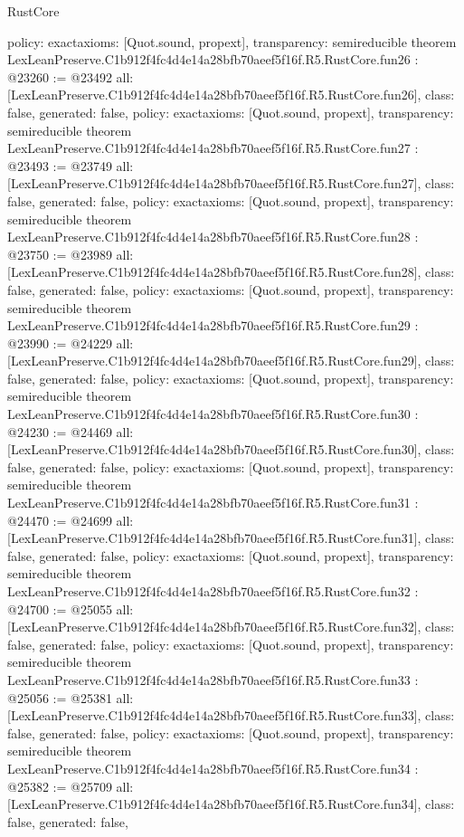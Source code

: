 \begin{lexlean}{RustCore}
\begin{coremodule}
{  policy: exact{axioms: [Quot.sound, propext]},
  transparency: semireducible
}
theorem LexLeanPreserve.C1b912f4fc4d4e14a28bfb70aeef5f16f.R5.RustCore.fun26 : @23260 := @23492 {
  all: [LexLeanPreserve.C1b912f4fc4d4e14a28bfb70aeef5f16f.R5.RustCore.fun26],
  class: false,
  generated: false,
  policy: exact{axioms: [Quot.sound, propext]},
  transparency: semireducible
}
theorem LexLeanPreserve.C1b912f4fc4d4e14a28bfb70aeef5f16f.R5.RustCore.fun27 : @23493 := @23749 {
  all: [LexLeanPreserve.C1b912f4fc4d4e14a28bfb70aeef5f16f.R5.RustCore.fun27],
  class: false,
  generated: false,
  policy: exact{axioms: [Quot.sound, propext]},
  transparency: semireducible
}
theorem LexLeanPreserve.C1b912f4fc4d4e14a28bfb70aeef5f16f.R5.RustCore.fun28 : @23750 := @23989 {
  all: [LexLeanPreserve.C1b912f4fc4d4e14a28bfb70aeef5f16f.R5.RustCore.fun28],
  class: false,
  generated: false,
  policy: exact{axioms: [Quot.sound, propext]},
  transparency: semireducible
}
theorem LexLeanPreserve.C1b912f4fc4d4e14a28bfb70aeef5f16f.R5.RustCore.fun29 : @23990 := @24229 {
  all: [LexLeanPreserve.C1b912f4fc4d4e14a28bfb70aeef5f16f.R5.RustCore.fun29],
  class: false,
  generated: false,
  policy: exact{axioms: [Quot.sound, propext]},
  transparency: semireducible
}
theorem LexLeanPreserve.C1b912f4fc4d4e14a28bfb70aeef5f16f.R5.RustCore.fun30 : @24230 := @24469 {
  all: [LexLeanPreserve.C1b912f4fc4d4e14a28bfb70aeef5f16f.R5.RustCore.fun30],
  class: false,
  generated: false,
  policy: exact{axioms: [Quot.sound, propext]},
  transparency: semireducible
}
theorem LexLeanPreserve.C1b912f4fc4d4e14a28bfb70aeef5f16f.R5.RustCore.fun31 : @24470 := @24699 {
  all: [LexLeanPreserve.C1b912f4fc4d4e14a28bfb70aeef5f16f.R5.RustCore.fun31],
  class: false,
  generated: false,
  policy: exact{axioms: [Quot.sound, propext]},
  transparency: semireducible
}
theorem LexLeanPreserve.C1b912f4fc4d4e14a28bfb70aeef5f16f.R5.RustCore.fun32 : @24700 := @25055 {
  all: [LexLeanPreserve.C1b912f4fc4d4e14a28bfb70aeef5f16f.R5.RustCore.fun32],
  class: false,
  generated: false,
  policy: exact{axioms: [Quot.sound, propext]},
  transparency: semireducible
}
theorem LexLeanPreserve.C1b912f4fc4d4e14a28bfb70aeef5f16f.R5.RustCore.fun33 : @25056 := @25381 {
  all: [LexLeanPreserve.C1b912f4fc4d4e14a28bfb70aeef5f16f.R5.RustCore.fun33],
  class: false,
  generated: false,
  policy: exact{axioms: [Quot.sound, propext]},
  transparency: semireducible
}
theorem LexLeanPreserve.C1b912f4fc4d4e14a28bfb70aeef5f16f.R5.RustCore.fun34 : @25382 := @25709 {
  all: [LexLeanPreserve.C1b912f4fc4d4e14a28bfb70aeef5f16f.R5.RustCore.fun34],
  class: false,
  generated: false,
}
\end{coremodule}
\end{lexlean}
